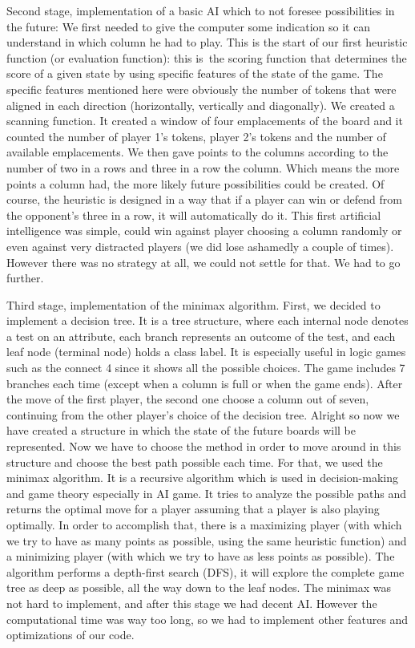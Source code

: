\documentclass[12pt, a4paper, oneside]{report}
\begin{document}
Second stage, implementation of a basic AI which to not foresee possibilities in the future:
	We first needed to give the computer some indication so it can understand in which column he had to play. This is the start of our first heuristic function (or evaluation function): this is the scoring function that determines the score of a given state by using specific features of the state of the game. The specific features mentioned here were obviously the number of tokens that were aligned in each direction (horizontally, vertically and diagonally). We created a scanning function. It created a window of four emplacements of the board and it counted the number of player 1’s tokens, player 2’s tokens and the number of available emplacements. We then gave points to the columns according to the number of two in a rows and three in a row the column. Which means the more points a column had, the more likely future possibilities could be created. Of course, the heuristic is designed in a way that if a player can win or defend from the opponent’s three in a row, it will automatically do it.
	This first artificial intelligence was simple, could win against player choosing a column randomly or even against very distracted players (we did lose ashamedly a couple of times). However there was no strategy at all, we could not settle for that. We had to go further.


Third stage, implementation of the minimax algorithm.
	First, we decided to implement a decision tree. It is a tree structure, where each internal node denotes a test on an attribute, each branch represents an outcome of the test, and each leaf node (terminal node) holds a class label. It is especially useful in logic games such as the connect 4 since it shows all the possible choices. The game includes 7 branches each time (except when a column is full or when the game ends). After the move of the first player, the second one choose a column out of seven, continuing from the other player’s choice of the decision tree.
	Alright so now we have created a structure in which the state of the future boards will be represented. Now we have to choose the method in order to move around in this structure and choose the best path possible each time. For that, we used the minimax algorithm. It is a recursive algorithm which is used in decision-making and game theory especially in AI game. It tries to analyze the possible paths and returns the optimal move for a player assuming that a player is also playing optimally. In order to accomplish that, there is a maximizing player (with which we try to have as many points as possible, using the same heuristic function) and a minimizing player (with which we try to have as less points as possible). The algorithm performs a depth-first search (DFS), it will explore the complete game tree as deep as possible, all the way down to the leaf nodes.
The minimax was not hard to implement, and after this stage we had  decent AI. However the computational time was way too long, so we had to implement other features and optimizations of our code.
\end{document}
